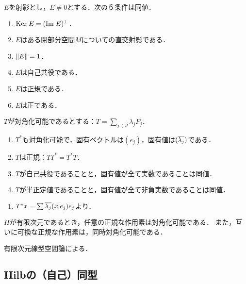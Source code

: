 \documentclass[uplatex,dvipdfmx]{jsreport}
\begin{document}
\begin{lemma}[直交射影の特徴付け]
    $E$を射影とし，$E\ne 0$とする．次の６条件は同値．
    \begin{enumerate}
        \item $\mathrm{Ker}\; E=(\mathrm{Im}\; E)^\perp$．
        \item $E$はある閉部分空間$M$についての直交射影である．
        \item $\|E\|=1$．
        \item $E$は自己共役である．
        \item $E$は正規である．
        \item $E$は正である．
    \end{enumerate}
\end{lemma}

\begin{lemma}[対角化可能作用素の性質]
    $T$が対角化可能であるとする：$T=\sum_{j\in J}\lambda_jP_j$．
    \begin{enumerate}
        \item $T^*$も対角化可能で，固有ベクトルは$(e_j)$，固有値は$(\overline{\lambda_j})$である．
        \item $T$は正規：$TT^*=T^*T$．
        \item $T$が自己共役であることと，固有値が全て実数であることは同値．
        \item $T$が半正定値であることと，固有値が全て非負実数であることは同値．
    \end{enumerate}
\end{lemma}
\begin{Proof}\mbox{}
    \begin{enumerate}
        \item $T^*x=\sum\overline{\lambda_j}(x|e_j)e_j$より．
    \end{enumerate}
\end{Proof}

\begin{proposition}[有限次元線型空間論]
    $H$が有限次元であるとき，任意の正規な作用素は対角化可能である．
    また，互いに可換な正規な作用素は，同時対角化可能である．
\end{proposition}
\begin{Proof}
    有限次元線型空間論による．
\end{Proof}

\subsection{Hilbの（自己）同型}
\end{document}

